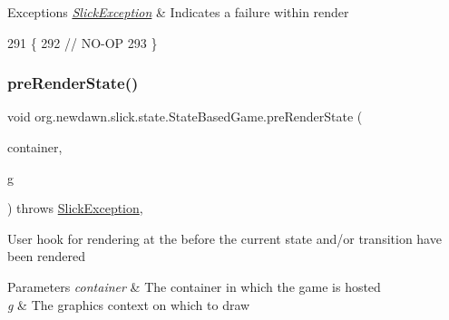 \begin{DoxyExceptions}{Exceptions}
{\em \mbox{\hyperlink{classorg_1_1newdawn_1_1slick_1_1_slick_exception}{Slick\+Exception}}} & Indicates a failure within render \\
\hline
\end{DoxyExceptions}

\begin{DoxyCode}
291                                                                                              \{
292         \textcolor{comment}{// NO-OP}
293     \}
\end{DoxyCode}
\mbox{\label{classorg_1_1newdawn_1_1slick_1_1state_1_1_state_based_game_aaf3bf464c31e3f420c1f152e36518670}} 
\subsubsection{\texorpdfstring{pre\+Render\+State()}{preRenderState()}}
{\footnotesize\ttfamily void org.\+newdawn.\+slick.\+state.\+State\+Based\+Game.\+pre\+Render\+State (\begin{DoxyParamCaption}\item[{\mbox{\hyperlink{classorg_1_1newdawn_1_1slick_1_1_game_container}{Game\+Container}}}]{container,  }\item[{\mbox{\hyperlink{classorg_1_1newdawn_1_1slick_1_1_graphics}{Graphics}}}]{g }\end{DoxyParamCaption}) throws \mbox{\hyperlink{classorg_1_1newdawn_1_1slick_1_1_slick_exception}{Slick\+Exception}}\hspace{0.3cm}{\ttfamily [inline]}, {\ttfamily [protected]}}

User hook for rendering at the before the current state and/or transition have been rendered


\begin{DoxyParams}{Parameters}
{\em container} & The container in which the game is hosted \\
\hline
{\em g} & The graphics context on which to draw \\
\hline
\end{DoxyParams}

